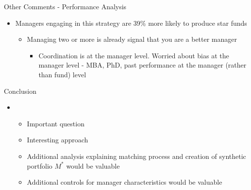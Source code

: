 \documentclass[12pt, aspectratio = 169%
]{beamer}
\newcommand{\1}{{\mathbbm{1}}}
\begin{document}
\begin{frame}{Other Comments - Performance Analysis}
\begin{itemize}
	\item Managers engaging in this strategy are 39\% more likely to produce star funds
		\begin{itemize} 
			\item Managing two or more is already signal that you are a better manager
			\begin{itemize}
				\item Coordination is at the manager level. Worried about bias at the manager level - 					MBA, PhD, past performance at the manager (rather than fund) level 
			\end{itemize}
		\end{itemize}
\end{itemize}
\end{frame}

\begin{frame}{Conclusion}
\begin{itemize}
	\item
		\begin{itemize} \itemsep3.5ex
		\item Important question
		\item Interesting approach
		\item Additional analysis explaining matching process and creation of synthetic portfolio $M^*$ 				would be valuable
		\item Additional controls for manager characteristics would be valuable
		\end{itemize}
\end{itemize}
\end{frame}
\end{document}
